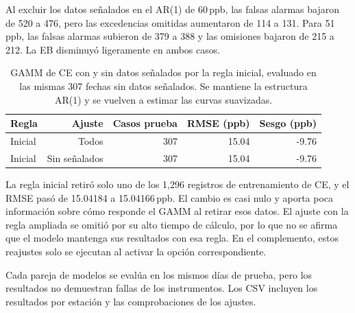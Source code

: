 \documentclass[11pt,letterpaper]{article}
\newcommand{\ppb}{\,ppb}
\newenvironment{cambio}{}{}
\begin{document}
\begin{cambio}
Al excluir los datos señalados en el AR(1) de 60\ppb, las falsas alarmas bajaron de 520 a 476, pero las excedencias omitidas aumentaron de 114 a 131. Para 51\ppb, las falsas alarmas subieron de 379 a 388 y las omisiones bajaron de 215 a 212. La EB disminuyó ligeramente en ambos casos.
\end{cambio}
\begin{table}[H]
\begin{cambio}\centering\small
\begin{tabular}{@{}lrrrr@{}}\toprule
Regla & Ajuste & Casos prueba & RMSE (ppb) & Sesgo (ppb)\\\midrule
Inicial & Todos & 307 & 15.04 & -9.76\\
Inicial & Sin señalados & 307 & 15.04 & -9.76\\
\bottomrule\end{tabular}
\caption{GAMM de CE con y sin datos señalados por la regla inicial, evaluado en las mismas 307 fechas sin datos señalados. Se mantiene la estructura AR(1) y se vuelven a estimar las curvas suavizadas.}\label{tab:gamm_calidad}
\end{cambio}
\end{table}
\begin{cambio}
La regla inicial retiró solo uno de los 1,296 registros de entrenamiento de CE, y el RMSE pasó de 15.04184 a 15.04166\ppb. El cambio es casi nulo y aporta poca información sobre cómo responde el GAMM al retirar esos datos. El ajuste con la regla ampliada se omitió por su alto tiempo de cálculo, por lo que no se afirma que el modelo mantenga sus resultados con esa regla. En el complemento, estos reajustes solo se ejecutan al activar la opción correspondiente.

Cada pareja de modelos se evalúa en los mismos días de prueba, pero los resultados no demuestran fallas de los instrumentos. Los CSV incluyen los resultados por estación y las comprobaciones de los ajustes.
\end{cambio}
\clearpage
\end{document}
